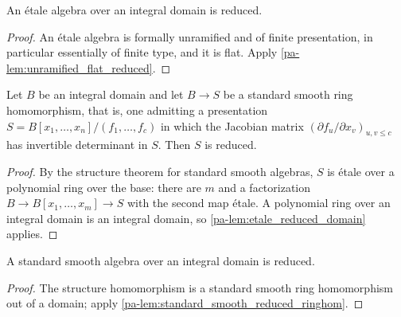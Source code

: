 \begin{lemma}
  \label{pa-lem:etale_reduced_domain}
  \leanok

  An \'etale algebra over an integral domain is reduced.
\end{lemma}
\begin{proof}
  \leanok
  An \'etale algebra is formally unramified and of finite presentation, in particular
  essentially of finite type, and it is flat. Apply \ref{pa-lem:unramified_flat_reduced}.
\end{proof}

\begin{lemma}
  \label{pa-lem:standard_smooth_reduced_ringhom}
  \leanok

  Let \(B\) be an integral domain and let \(B \to S\) be a standard smooth ring homomorphism,
  that is, one admitting a presentation \(S = B[x_1,\dots,x_n]/(f_1,\dots,f_c)\) in which the
  Jacobian matrix \((\partial f_u/\partial x_v)_{u,v \le c}\) has invertible determinant in
  \(S\). Then \(S\) is reduced.
\end{lemma}
\begin{proof}
  \leanok
  By the structure theorem for standard smooth algebras, \(S\) is \'etale over a polynomial
  ring over the base: there are \(m\) and a factorization
  \(B \to B[x_1,\dots,x_m] \to S\) with the second map \'etale. A polynomial ring over an
  integral domain is an integral domain, so \ref{pa-lem:etale_reduced_domain} applies.
\end{proof}

\begin{lemma}
  \label{pa-lem:standard_smooth_reduced}
  \leanok

  A standard smooth algebra over an integral domain is reduced.
\end{lemma}
\begin{proof}
  \leanok
  The structure homomorphism is a standard smooth ring homomorphism out of a domain; apply
  \ref{pa-lem:standard_smooth_reduced_ringhom}.
\end{proof}

